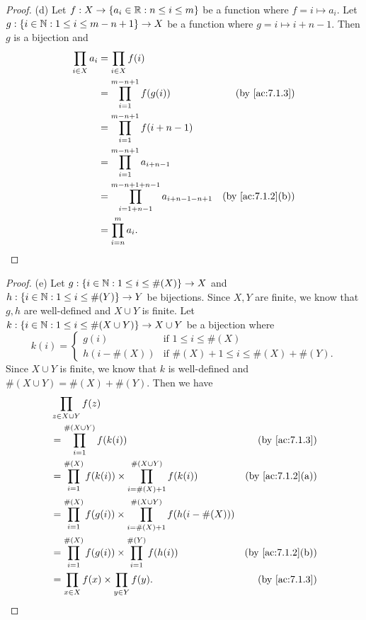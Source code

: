 \begin{proof}{(d)}
  Let \(f : X \to \{a_i \in \mathbb{R} : n \leq i \leq m\}\) be a function where \(f = i \mapsto a_i\).
  Let \(g : \{i \in \mathbb{N} : 1 \leq i \leq m - n + 1\} \to X\) be a function where \(g = i \mapsto i + n - 1\).
  Then \(g\) is a bijection and
  \begin{align*}
    \prod_{i \in X} a_i & = \prod_{i \in X} f(i)                                                                             \\
                        & = \prod_{i = 1}^{m - n + 1} f(g(i))                               & \text{(by \cref{ac:7.1.3})}    \\
                        & = \prod_{i = 1}^{m - n + 1} f(i + n - 1)                                                           \\
                        & = \prod_{i = 1}^{m - n + 1} a_{i + n - 1}                                                          \\
                        & = \prod_{i = 1 + n - 1}^{m - n + 1 + n - 1} a_{i + n - 1 - n + 1} & \text{(by \cref{ac:7.1.2}(b))} \\
                        & = \prod_{i = n}^m a_i.
  \end{align*}
\end{proof}

\begin{proof}{(e)}
  Let \(g : \{i \in \mathbb{N} : 1 \leq i \leq \#(X)\} \to X\) and \(h : \{i \in \mathbb{N} : 1 \leq i \leq \#(Y)\} \to Y\) be bijections.
  Since \(X, Y\) are finite, we know that \(g, h\) are well-defined and \(X \cup Y\) is finite.
  Let \(k : \{i \in \mathbb{N} : 1 \leq i \leq \#(X \cup Y)\} \to X \cup Y\) be a bijection where
  \[
    k(i) = \begin{cases}
      g(i)         & \text{if } 1 \leq i \leq \#(X)                  \\
      h(i - \#(X)) & \text{if } \#(X) + 1 \leq i \leq \#(X) + \#(Y).
    \end{cases}
  \]
  Since \(X \cup Y\) is finite, we know that \(k\) is well-defined and \(\#(X \cup Y) = \#(X) + \#(Y)\).
  Then we have
  \begin{align*}
     & \prod_{z \in X \cup Y} f(z)                                                                                                  \\
     & = \prod_{i = 1}^{\#(X \cup Y)} f(k(i))                                                      & \text{(by \cref{ac:7.1.3})}    \\
     & = \prod_{i = 1}^{\#(X)} f(k(i)) \times \prod_{i = \#(X) + 1}^{\#(X \cup Y)} f(k(i))         & \text{(by \cref{ac:7.1.2}(a))} \\
     & = \prod_{i = 1}^{\#(X)} f(g(i)) \times \prod_{i = \#(X) + 1}^{\#(X \cup Y)} f(h(i - \#(X)))                                  \\
     & = \prod_{i = 1}^{\#(X)} f(g(i)) \times \prod_{i = 1}^{\#(Y)} f(h(i))                        & \text{(by \cref{ac:7.1.2}(b))} \\
     & = \prod_{x \in X} f(x) \times \prod_{y \in Y} f(y).                                         & \text{(by \cref{ac:7.1.3})}
  \end{align*}
\end{proof}

